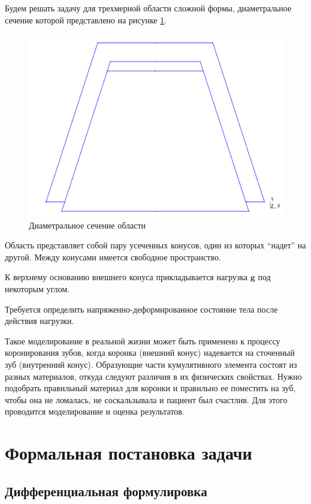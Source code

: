 \documentclass[a4paper, 14pt]{extreport}
\begin{document}
Будем решать задачу для трехмерной области сложной формы, диаметральное сечение
которой представлено на рисунке \ref{fig: domain}.
\begin{figure}[h]
	\center
	\includegraphics[scale=0.3]{pictures/1.png}
	\caption{Диаметральное сечение области}
	\label{fig: domain}
\end{figure}

Область представляет собой пару усеченных конусов, один из которых
\enquote{надет} на другой. Между конусами имеется свободное пространство.

К верхнему основанию внешнего конуса прикладывается нагрузка $\textbf{g}$
под некоторым углом.

Требуется определить напряженно-деформированное состояние тела после
действия нагрузки.

Такое моделирование в реальной жизни может быть применено к
процессу коронирования зубов, когда коронка (внешний конус) надевается
на сточенный зуб (внутренний конус). Образующие части кумулятивного
элемента состоят из разных материалов, откуда следуют различия в их
физических свойствах. Нужно подобрать правильный материал для коронки
и правильно ее поместить на зуб, чтобы она не ломалась, 
не соскальзывала и пациент был счастлив. Для этого 
проводится моделирование и оценка результатов.


\section{Формальная постановка задачи}
\subsection{ Дифференциальная формулировка}
\end{document}
